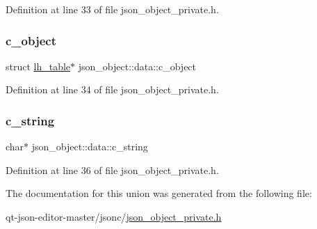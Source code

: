 Definition at line 33 of file json\+\_\+object\+\_\+private.\+h.

\mbox{\label{unionjson__object_1_1data_a68089c942f154d4df590d8ecb476a69b}} 
\subsubsection{\texorpdfstring{c\+\_\+object}{c\_object}}
{\footnotesize\ttfamily struct \hyperlink{structlh__table}{lh\+\_\+table}$\ast$ json\+\_\+object\+::data\+::c\+\_\+object}



Definition at line 34 of file json\+\_\+object\+\_\+private.\+h.

\mbox{\label{unionjson__object_1_1data_a2749f46b4691f85695cecb9f4e365321}} 
\subsubsection{\texorpdfstring{c\+\_\+string}{c\_string}}
{\footnotesize\ttfamily char$\ast$ json\+\_\+object\+::data\+::c\+\_\+string}



Definition at line 36 of file json\+\_\+object\+\_\+private.\+h.



The documentation for this union was generated from the following file\+:\begin{DoxyCompactItemize}
\item 
qt-\/json-\/editor-\/master/jsonc/\hyperlink{json__object__private_8h}{json\+\_\+object\+\_\+private.\+h}\end{DoxyCompactItemize}
